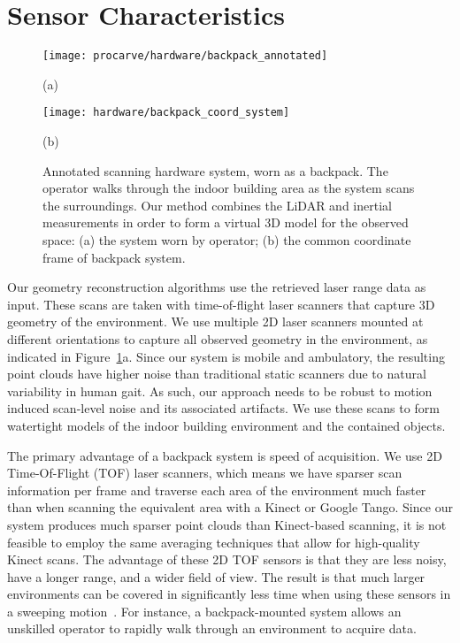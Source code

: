 \documentclass[12pt,onecolumn,oneside]{book}
\begin{document}
\section{Sensor Characteristics}
\label{sec:sensor_specs}

\begin{figure}[t]

	\begin{minipage}[c]{0.54\linewidth}
		\centerline{\texttt{[image: procarve/hardware/backpack\_annotated]}}
		\centerline{(a)}\medskip
	\end{minipage}
	\hfill
	\begin{minipage}[c]{0.46\linewidth}
		\centerline{\texttt{[image: hardware/backpack\_coord\_system]}}
		\centerline{(b)}\medskip
	\end{minipage}

	\caption[Annotated scanning hardware system.]{Annotated scanning hardware system, worn as a backpack.  The operator walks through the indoor building area as the system scans the surroundings.  Our method combines the LiDAR and inertial measurements in order to form a virtual 3D model for the observed space:  (a) the system worn by operator; (b) the common coordinate frame of backpack system.}
	\label{fig:backpack}
\end{figure}

Our geometry reconstruction algorithms use the retrieved laser range data as input.  These scans are taken with time-of-flight laser scanners that capture 3D geometry of the environment.  We use multiple 2D laser scanners mounted at different orientations to capture all observed geometry in the environment, as indicated in Figure~\ref{fig:backpack}a.  Since our system is mobile and ambulatory, the resulting point clouds have higher noise than traditional static scanners due to natural variability in human gait.  As such, our approach needs to be robust to motion induced scan-level noise and its associated artifacts.  We use these scans to form watertight models of the indoor building environment and the contained objects.

The primary advantage of a backpack system is speed of acquisition.  We use 2D Time-Of-Flight (TOF) laser scanners, which means we have sparser scan information per frame and traverse each area of the environment much faster than when scanning the equivalent area with a Kinect or Google Tango.  Since our system produces much sparser point clouds than Kinect-based scanning, it is not feasible to employ the same averaging techniques that allow for high-quality Kinect scans.  The advantage of these 2D TOF sensors is that they are less noisy, have a longer range, and a wider field of view.  The result is that much larger environments can be covered in significantly less time when using these sensors in a sweeping motion~\cite{Sweep}.  For instance, a backpack-mounted system allows an unskilled operator to rapidly walk through an environment to acquire data.
\end{document}
